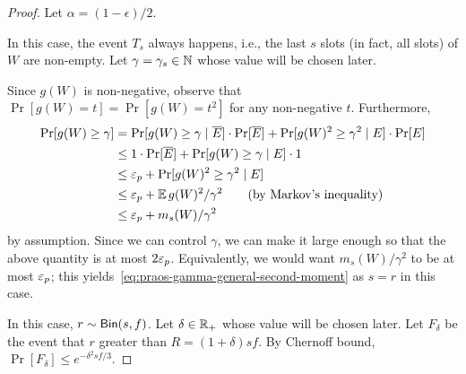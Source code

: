 \begin{proof}
  Let $\alpha = (1-\epsilon)/2$. 

  In this case, the event $T_s$ always happens, i.e., 
  the last $s$ slots (in fact, all slots) of $W$ are non-empty.
  Let $\gamma = \gamma_s \in \mathbb{N}$ whose value will be chosen later. 


  Since $g(W)$ is non-negative, observe that 
  $\Pr[g(W) = t] = \Pr[g(W) = t^2]$ for any non-negative $t$. 
  Furthermore, 
  \begin{align*}
    \Pr[g(W) \geq \gamma]
    &= \Pr[g(W) \geq \gamma \mid \overline{E}] \cdot \Pr[\overline{E}] 
      + \Pr[g(W)^2 \geq \gamma^2 \mid E] \cdot \Pr[E]\\
    &\leq 1 \cdot \Pr[\overline{E}] + \Pr[g(W) \geq \gamma \mid E] \cdot 1 \\
    &\leq \mathsf{\varepsilon}_p + \Pr[g(W)^2 \geq \gamma^2 \mid E] \\
    &\leq \mathsf{\varepsilon}_p + \operatorname{\mathbb{E}} g(W)^2/\gamma^2 \qquad \text{(by Markov's inequality)} \\
    &\leq \mathsf{\varepsilon}_p + m_s(W)/\gamma^2 
  \end{align*}
  by assumption. Since we can control $\gamma$,
  we can make it large enough so that the above quantity is at most $2 \mathsf{\varepsilon}_p$. 
  Equivalently, we would want 
  $m_s(W)/\gamma^2$ to be at most $\mathsf{\varepsilon}_p$; 
  this yields~\eqref{eq:praos-gamma-general-second-moment} 
  as $s = r$ in this case.


  In this case, $r \sim \mathsf{Bin}(s, f)$. 
  Let $\delta \in \mathbb{R}_+$ whose value will be chosen later. 
  Let $F_\delta$ be the event that $r$ greater than $R = (1+\delta)s f$.
  By Chernoff bound, $\Pr[F_\delta] \leq e^{-\delta^2 sf/3}$. 



\end{proof}


